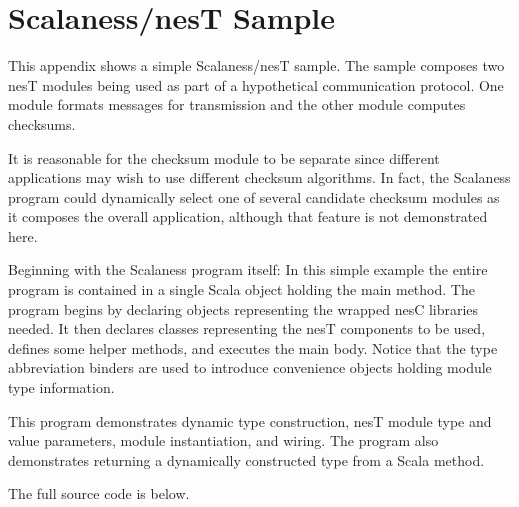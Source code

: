 
\chapter{Scalaness/nesT Sample}
\label{chapter-sample}


This appendix shows a simple Scalaness/nesT sample. The sample composes two nesT modules
being used as part of a hypothetical communication protocol. One module formats messages for
transmission and the other module computes checksums.

It is reasonable for the checksum module to be separate since different applications may wish to
use different checksum algorithms. In fact, the Scalaness program could dynamically select one
of several candidate checksum modules as it composes the overall application, although that
feature is not demonstrated here.

Beginning with the Scalaness program itself: In this simple example the entire program is
contained in a single Scala object holding the main method. The program begins by declaring
objects representing the wrapped nesC libraries needed. It then declares classes representing
the nesT components to be used, defines some helper methods, and executes the main body. Notice
that the type abbreviation binders \cite{watson-masters-2013} are used to introduce convenience
objects holding module type information.

This program demonstrates dynamic type construction, nesT module type and value parameters,
module instantiation, and wiring. The program also demonstrates returning a dynamically
constructed type from a Scala method.

The full source code is below.

